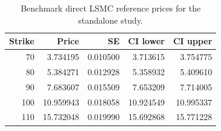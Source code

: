 \begin{table}[htbp]
\centering
\caption{Benchmark direct LSMC reference prices for the standalone study.}
\label{tab:bgk_r05_v0114_vp009_t1_delta05_nex12-benchmark-references}
\begin{tabular}{rrrrr}
\toprule
Strike & Price & SE & CI lower & CI upper \\
\midrule
70 & 3.734195 & 0.010500 & 3.713615 & 3.754775 \\
80 & 5.384271 & 0.012928 & 5.358932 & 5.409610 \\
90 & 7.683607 & 0.015509 & 7.653209 & 7.714005 \\
100 & 10.959943 & 0.018058 & 10.924549 & 10.995337 \\
110 & 15.732048 & 0.019990 & 15.692868 & 15.771228 \\
\bottomrule
\end{tabular}
\end{table}
